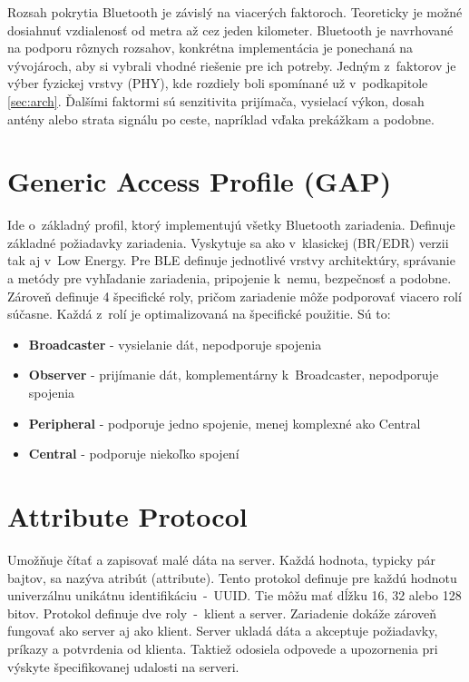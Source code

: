 Rozsah pokrytia Bluetooth je závislý na viacerých faktoroch. Teoreticky je možné dosiahnuť vzdialenosť od metra až cez jeden kilometer. Bluetooth je navrhované na podporu rôznych rozsahov, konkrétna implementácia je ponechaná na vývojároch, aby si vybrali vhodné riešenie pre ich potreby. Jedným z~faktorov je výber fyzickej vrstvy (PHY), kde rozdiely boli spomínané už v~podkapitole \ref{sec:arch}. Ďalšími faktormi sú senzitivita prijímača, vysielací výkon, dosah antény alebo strata signálu po ceste, napríklad vďaka prekážkam a podobne.\cite{bluetooth}

\section{Generic Access Profile (GAP)}\label{sec:gap}

Ide o~základný profil, ktorý implementujú všetky Bluetooth zariadenia. Definuje základné požiadavky zariadenia. Vyskytuje sa ako v~klasickej (BR/EDR) verzii tak aj v~Low Energy. Pre BLE definuje jednotlivé vrstvy architektúry, správanie a metódy pre vyhľadanie zariadenia, pripojenie k~nemu, bezpečnosť a podobne.
Zároveň definuje 4 špecifické roly, pričom zariadenie môže podporovať viacero rolí súčasne. Každá z~rolí je optimalizovaná na špecifické použitie. Sú to:
\begin{itemize}
    \item \textbf{Broadcaster} - vysielanie dát, nepodporuje spojenia
    \item \textbf{Observer} - prijímanie dát, komplementárny k~Broadcaster, nepodporuje spojenia
    \item \textbf{Peripheral} - podporuje jedno spojenie, menej komplexné ako Central
    \item \textbf{Central} - podporuje niekoľko spojení\cite{bluetooth}
\end{itemize}

\section{Attribute Protocol}

Umožňuje čítať a zapisovať malé dáta na server. Každá hodnota, typicky pár bajtov, sa nazýva atribút (attribute). Tento protokol definuje pre každú hodnotu univerzálnu unikátnu identifikáciu~-~UUID. Tie môžu mať dĺžku 16, 32 alebo 128 bitov.
Protokol definuje dve roly~-~klient a server. Zariadenie dokáže zároveň fungovať ako server aj ako klient. Server ukladá dáta a akceptuje požiadavky, príkazy a potvrdenia od klienta. Taktiež odosiela odpovede a upozornenia pri výskyte špecifikovanej udalosti na serveri.\cite{bluetooth}

